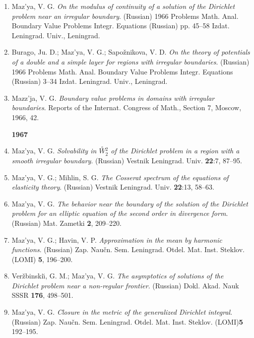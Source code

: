 \documentclass{article}
\begin{document}
\begin{enumerate}
{\bf 1966}
\item Maz'ya, V. G. {\it On the modulus of continuity of a solution of
the
Dirichlet problem near an
irregular boundary}.  (Russian) 1966 Problems Math. Anal. Boundary
Value
Problems Integr. Equations (Russian) pp. 45--58 Izdat.
Leningrad. Univ., Leningrad.
\item Burago, Ju. D.; Maz'ya, V. G.; Sapo\v znikova, V. D. {\it On the
theory of potentials of a double and a simple
layer for regions with irregular boundaries}. (Russian) 1966 Problems
Math.
Anal. Boundary Value Problems Integr. Equations
(Russian) 3--34 Izdat. Leningrad. Univ., Leningrad.
\item Mazz'ja, V. G. {\it Boundary value problems in domains with
irregular
boundaries}. Reports of the Internat. Congress of Math.,
Section 7, Moscow, 1966, 42.\hfill\break

{\bf 1967}
\item Maz'ya, V. G. {\it Solvability in
$\stackrel{\circ}{W}\!\!{}^2_2$ of
the Dirichlet problem in a region with a smooth irregular boundary}.
(Russian) Vestnik Leningrad. Univ. {\bf 22}:7, 87--95.
\item Maz'ya, V. G.; Mihlin, S. G. {\it The Cosserat spectrum of the
equations of elasticity theory}.
(Russian) Vestnik Leningrad. Univ. {\bf 22}:13, 58--63.
\item Maz'ya, V. G. {\it The behavior near the boundary of the
solution of
the Dirichlet problem for an
elliptic equation of the second order in divergence form}. (Russian)
Mat.
Zametki {\bf 2}, 209--220.
\item Maz'ya, V. G.; Havin, V. P. {\it Approximation in the mean by
harmonic functions}.
(Russian) Zap. Nau\v cn. Sem. Leningrad. Otdel. Mat. Inst. Steklov.
(LOMI)
{\bf 5}, 196--200.
\item Ver\v zbinski{\u\i}, G. M.; Maz'ya, V. G. {\it The asymptotics
of
solutions of the Dirichlet problem
near a non-regular frontier}. (Russian) Dokl. Akad. Nauk SSSR {\bf
176},
498--501.
\item Maz'ya, V. G. {\it Closure in the metric of the generalized
Dirichlet
integral}. (Russian) Zap. Nau\v cn. Sem.
Leningrad. Otdel. Mat. Inst. Steklov. (LOMI){\bf 5}
192--195.\hfill\break


\end{enumerate}
\end{document}
